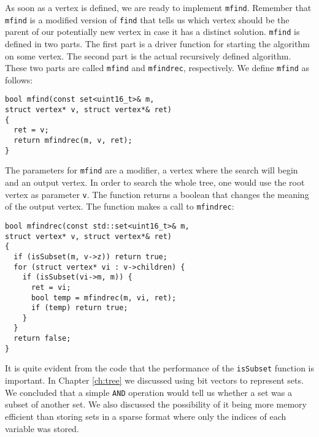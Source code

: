 As soon as a vertex is defined, we are ready to implement \texttt{mfind}.
Remember that \texttt{mfind} is a modified version of \texttt{find} that tells
us which vertex should be the parent of our potentially new vertex in case it
has a distinct solution.
\texttt{mfind} is defined in two parts. The first part is a driver function
for starting the algorithm on some vertex. The second part is the actual
recursively defined algorithm. These two parts are called \texttt{mfind} and
\texttt{mfindrec}, respectively. We define \texttt{mfind} as follows:
\begin{verbatim}
bool mfind(const set<uint16_t>& m,
struct vertex* v, struct vertex*& ret)
{
  ret = v;
  return mfindrec(m, v, ret);
}
\end{verbatim}
The parameters for \texttt{mfind} are a modifier, a vertex where the search
will begin and an output vertex.
In order to search the whole tree, one would use the root vertex as parameter
\texttt{v}.
The function returns a boolean that changes the meaning of the output vertex.
The function makes a call to \texttt{mfindrec}:
\begin{verbatim}
bool mfindrec(const std::set<uint16_t>& m,
struct vertex* v, struct vertex*& ret)
{
  if (isSubset(m, v->z)) return true;
  for (struct vertex* vi : v->children) {
    if (isSubset(vi->m, m)) {
      ret = vi; 
      bool temp = mfindrec(m, vi, ret);
      if (temp) return true;
    }   
  }   
  return false;
}
\end{verbatim}
It is quite evident from the code that the performance of the \texttt{isSubset}
function is important. In Chapter \ref{ch:tree} we discussed using bit vectors 
to represent sets. We concluded that a simple \texttt{AND} operation would tell
us whether a set was a subset of another set.
We also discussed the possibility of it being more memory efficient than
storing sets in a sparse format where only the indices of each variable was
stored.

